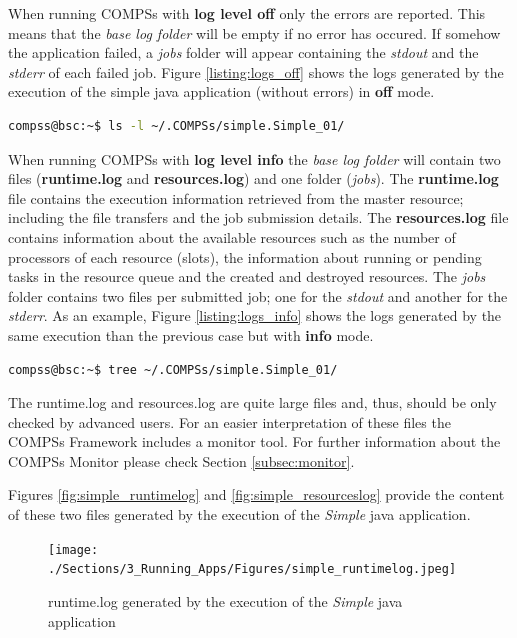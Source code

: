 When running COMPSs with \textbf{log level off} only the errors are reported. This means that the \textit{base log folder} will be
empty if no error has occured. If somehow the application failed, a \textit{jobs} folder will appear containing the \textit{stdout}
and the \textit{stderr} of each failed job. Figure \ref{listing:logs_off} shows the logs generated by the execution of the simple 
java application (without errors) in \textbf{off} mode. 
\begin{lstlisting}[language=bash]
compss@bsc:~$ ls -l ~/.COMPSs/simple.Simple_01/
\end{lstlisting}
\label{listing:logs_off}

When running COMPSs with \textbf{log level info} the \textit{base log folder} will contain two files (\textbf{runtime.log} and 
\textbf{resources.log}) and one folder (\textit{jobs}). The \textbf{runtime.log} file contains the execution information retrieved 
from the master resource; including the file transfers and the job submission details. The \textbf{resources.log} file contains 
information about the available resources such as the number of processors of each resource (slots), the information about running or 
pending tasks in the resource queue and the created and destroyed resources. The \textit{jobs} folder contains two files 
per submitted job; one for the \textit{stdout} and another for the \textit{stderr}. As an example, Figure \ref{listing:logs_info} 
shows the logs generated by the same execution than the previous case but with \textbf{info} mode. 
\begin{lstlisting}[language=bash]
compss@bsc:~$ tree ~/.COMPSs/simple.Simple_01/
\end{lstlisting}
\label{listing:logs_info}

The runtime.log and resources.log are quite large files and, thus, should be only checked by advanced users. For an
easier interpretation of these files the COMPSs Framework includes a monitor tool. For further information about the COMPSs Monitor
please check Section \ref{subsec:monitor}.

Figures \ref{fig:simple_runtimelog} and \ref{fig:simple_resourceslog} provide the content of these two files generated
by the execution of the \textit{Simple} java application. 
\begin{figure}[h!]
  \centering
    \texttt{[image: ./Sections/3\_Running\_Apps/Figures/simple\_runtimelog.jpeg]}
    \caption{runtime.log generated by the execution of the \textit{Simple} java application}
\end{figure}
\label{fig:simple_runtimelog}

